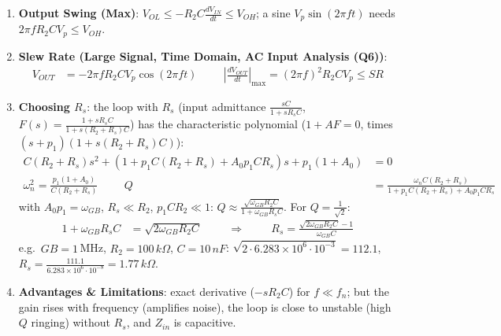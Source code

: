 \begin{enumerate}
    \paragraph{At Output:} as Section~\ref{sec:amp_inverting}, \(Z_{out} = \frac{R_o}{1 + A F(s)}\).
  \item \textbf{Output Swing (Max)}: \(V_{OL} \leq -R_2 C \frac{dV_{IN}}{dt} \leq V_{OH}\); a sine
    \(V_p\sin(2\pi f t)\) needs \(2\pi f R_2 C V_p \leq V_{OH}\).
  \item \textbf{Slew Rate (Large Signal, Time Domain, AC Input Analysis (Q6))}:
    \begin{align*}
      V_{OUT} &= -2\pi f R_2 C V_p \cos(2\pi f t) \hspace{1cm} \left|\frac{dV_{OUT}}{dt}\right|_{\max} = (2\pi f)^2 R_2 C V_p \leq SR
    \end{align*}
  \item \textbf{Choosing \(R_s\)}: the loop with \(R_s\) (input admittance \(\frac{sC}{1 + sR_s C}\), \(F(s) = \frac{1 + sR_s C}{1 + s(R_2 + R_s)C}\))
    has the characteristic polynomial (\(1 + A F = 0\), times \((s + p_1)(1 + s(R_2 + R_s)C)\)):
    \begin{align*}
      C(R_2 + R_s) s^2 + \left(1 + p_1 C(R_2 + R_s) + A_0 p_1 C R_s\right) s + p_1(1 + A_0) &= 0 \\
      \omega_n^2 = \frac{p_1(1 + A_0)}{C(R_2 + R_s)} \hspace{1cm}
      Q &= \frac{\omega_n C (R_2 + R_s)}{1 + p_1 C(R_2 + R_s) + A_0 p_1 C R_s}
    \end{align*}
    with \(A_0 p_1 = \omega_{GB}\), \(R_s \ll R_2\), \(p_1 C R_2 \ll 1\): \(Q \approx \frac{\sqrt{\omega_{GB} R_2 C}}{1 + \omega_{GB} R_s C}\). For \(Q = \frac{1}{\sqrt{2}}\):
    \begin{align*}
      1 + \omega_{GB} R_s C &= \sqrt{2\omega_{GB} R_2 C} \hspace{1cm} \Rightarrow \hspace{1cm} R_s = \frac{\sqrt{2\omega_{GB} R_2 C} - 1}{\omega_{GB} C}
    \end{align*}
    e.g.\ \(GB = 1\,\)MHz, \(R_2 = 100\,k\Omega\), \(C = 10\,nF\): \(\sqrt{2 \cdot 6.283 \times 10^6 \cdot 10^{-3}} = 112.1\),
    \(R_s = \frac{111.1}{6.283 \times 10^6 \cdot 10^{-8}} = 1.77\,k\Omega\).
  \item \textbf{Advantages \& Limitations}: exact derivative (\(-s R_2 C\)) for \(f \ll f_n\);
    but the gain rises with frequency (amplifies noise), the loop is close to unstable
    (high \(Q\) ringing) without \(R_s\), and \(Z_{in}\) is capacitive.
\end{enumerate}

